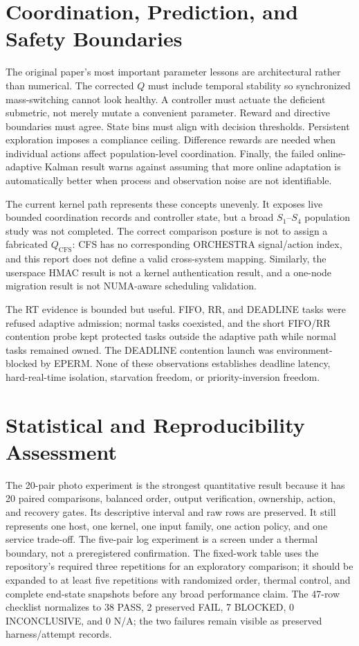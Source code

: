 \documentclass[10pt,letterpaper,twocolumn]{article}
\begin{document}
\section{Coordination, Prediction, and Safety Boundaries}

The original paper's most important parameter lessons are architectural rather than numerical. The corrected $Q$ must include temporal stability so synchronized mass-switching cannot look healthy. A controller must actuate the deficient submetric, not merely mutate a convenient parameter. Reward and directive boundaries must agree. State bins must align with decision thresholds. Persistent exploration imposes a compliance ceiling. Difference rewards are needed when individual actions affect population-level coordination. Finally, the failed online-adaptive Kalman result warns against assuming that more online adaptation is automatically better when process and observation noise are not identifiable.

The current kernel path represents these concepts unevenly. It exposes live bounded coordination records and controller state, but a broad $S_1$--$S_4$ population study was not completed. The correct comparison posture is not to assign a fabricated $Q_{\mathrm{CFS}}$: CFS has no corresponding ORCHESTRA signal/action index, and this report does not define a valid cross-system mapping. Similarly, the userspace HMAC result is not a kernel authentication result, and a one-node migration result is not NUMA-aware scheduling validation.

The RT evidence is bounded but useful. FIFO, RR, and DEADLINE tasks were refused adaptive admission; normal tasks coexisted, and the short FIFO/RR contention probe kept protected tasks outside the adaptive path while normal tasks remained owned. The DEADLINE contention launch was environment-blocked by EPERM. None of these observations establishes deadline latency, hard-real-time isolation, starvation freedom, or priority-inversion freedom.

\section{Statistical and Reproducibility Assessment}

The 20-pair photo experiment is the strongest quantitative result because it has 20 paired comparisons, balanced order, output verification, ownership, action, and recovery gates. Its descriptive interval and raw rows are preserved. It still represents one host, one kernel, one input family, one action policy, and one service trade-off. The five-pair log experiment is a screen under a thermal boundary, not a preregistered confirmation. The fixed-work table uses the repository’s required three repetitions for an exploratory comparison; it should be expanded to at least five repetitions with randomized order, thermal control, and complete end-state snapshots before any broad performance claim. The 47-row checklist normalizes to 38 PASS, 2 preserved FAIL, 7 BLOCKED, 0 INCONCLUSIVE, and 0 N/A; the two failures remain visible as preserved harness/attempt records.
\end{document}
